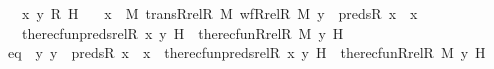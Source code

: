 \begin{isabellebody}
\ \ \ x\ y\ R\ H\isanewline
\ \ \ {\isachardoublequoteopen}x\ {\isasymin}\ M{\isachardoublequoteclose}\ {\isachardoublequoteopen}trans{\isacharparenleft}{\kern0pt}Rrel{\isacharparenleft}{\kern0pt}R{\isacharcomma}{\kern0pt}\ M{\isacharparenright}{\kern0pt}{\isacharparenright}{\kern0pt}{\isachardoublequoteclose}\ {\isachardoublequoteopen}wf{\isacharparenleft}{\kern0pt}Rrel{\isacharparenleft}{\kern0pt}R{\isacharcomma}{\kern0pt}\ M{\isacharparenright}{\kern0pt}{\isacharparenright}{\kern0pt}{\isachardoublequoteclose}\ {\isachardoublequoteopen}y\ {\isasymin}\ preds{\isacharparenleft}{\kern0pt}R{\isacharcomma}{\kern0pt}\ x{\isacharparenright}{\kern0pt}\ {\isasymunion}\ {\isacharbraceleft}{\kern0pt}x{\isacharbraceright}{\kern0pt}{\isachardoublequoteclose}\ \isanewline
\ \ \ {\isachardoublequoteopen}the{\isacharunderscore}{\kern0pt}recfun{\isacharparenleft}{\kern0pt}preds{\isacharunderscore}{\kern0pt}rel{\isacharparenleft}{\kern0pt}R{\isacharcomma}{\kern0pt}\ x{\isacharparenright}{\kern0pt}{\isacharcomma}{\kern0pt}\ y{\isacharcomma}{\kern0pt}\ H{\isacharparenright}{\kern0pt}\ {\isacharequal}{\kern0pt}\ the{\isacharunderscore}{\kern0pt}recfun{\isacharparenleft}{\kern0pt}Rrel{\isacharparenleft}{\kern0pt}R{\isacharcomma}{\kern0pt}\ M{\isacharparenright}{\kern0pt}{\isacharcomma}{\kern0pt}\ y{\isacharcomma}{\kern0pt}\ H{\isacharparenright}{\kern0pt}{\isachardoublequoteclose}\ \isanewline
%
\isadelimproof
%
\endisadelimproof
%
\isatagproof
{}\isamarkupfalse%
\ {\isacharminus}{\kern0pt}\ \isanewline
\ \ \isamarkupfalse%
\ eq\ {\isacharcolon}{\kern0pt}\ {\isachardoublequoteopen}{\isasymAnd}y{\isachardot}{\kern0pt}\ y\ {\isasymin}\ preds{\isacharparenleft}{\kern0pt}R{\isacharcomma}{\kern0pt}\ x{\isacharparenright}{\kern0pt}\ {\isasymunion}\ {\isacharbraceleft}{\kern0pt}x{\isacharbraceright}{\kern0pt}\ {\isasymlongrightarrow}\ the{\isacharunderscore}{\kern0pt}recfun{\isacharparenleft}{\kern0pt}preds{\isacharunderscore}{\kern0pt}rel{\isacharparenleft}{\kern0pt}R{\isacharcomma}{\kern0pt}\ x{\isacharparenright}{\kern0pt}{\isacharcomma}{\kern0pt}\ y{\isacharcomma}{\kern0pt}\ H{\isacharparenright}{\kern0pt}\ {\isacharequal}{\kern0pt}\ the{\isacharunderscore}{\kern0pt}recfun{\isacharparenleft}{\kern0pt}Rrel{\isacharparenleft}{\kern0pt}R{\isacharcomma}{\kern0pt}\ M{\isacharparenright}{\kern0pt}{\isacharcomma}{\kern0pt}\ y{\isacharcomma}{\kern0pt}\ H{\isacharparenright}{\kern0pt}{\isachardoublequoteclose}\isanewline
\ \ \isamarkupfalse%

\end{isabellebody}
